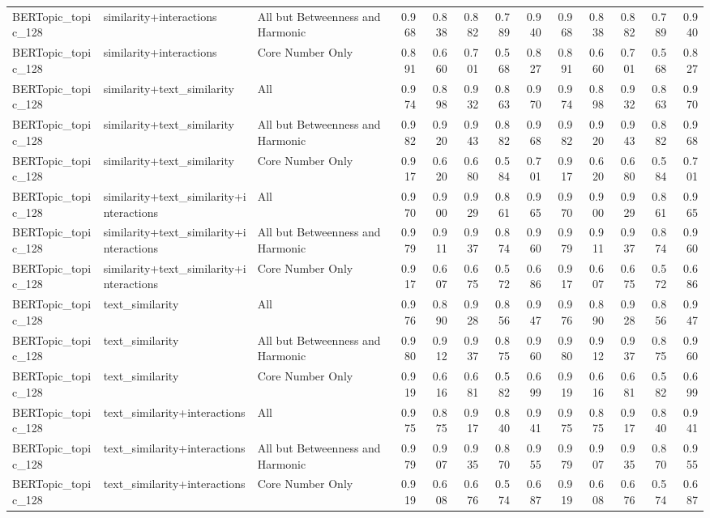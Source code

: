 \begin{tabular}{lllrrrrrrrrrr}
BERTopic_topic_128 & similarity+interactions & All but Betweenness and Harmonic & 0.968 & 0.838 & 0.882 & 0.789 & 0.940 & 0.968 & 0.838 & 0.882 & 0.789 & 0.940 \\
BERTopic_topic_128 & similarity+interactions & Core Number Only & 0.891 & 0.660 & 0.701 & 0.568 & 0.827 & 0.891 & 0.660 & 0.701 & 0.568 & 0.827 \\
BERTopic_topic_128 & similarity+text_similarity & All & 0.974 & 0.898 & 0.932 & 0.863 & 0.970 & 0.974 & 0.898 & 0.932 & 0.863 & 0.970 \\
BERTopic_topic_128 & similarity+text_similarity & All but Betweenness and Harmonic & 0.982 & 0.920 & 0.943 & 0.882 & 0.968 & 0.982 & 0.920 & 0.943 & 0.882 & 0.968 \\
BERTopic_topic_128 & similarity+text_similarity & Core Number Only & 0.917 & 0.620 & 0.680 & 0.584 & 0.701 & 0.917 & 0.620 & 0.680 & 0.584 & 0.701 \\
BERTopic_topic_128 & similarity+text_similarity+interactions & All & 0.970 & 0.900 & 0.929 & 0.861 & 0.965 & 0.970 & 0.900 & 0.929 & 0.861 & 0.965 \\
BERTopic_topic_128 & similarity+text_similarity+interactions & All but Betweenness and Harmonic & 0.979 & 0.911 & 0.937 & 0.874 & 0.960 & 0.979 & 0.911 & 0.937 & 0.874 & 0.960 \\
BERTopic_topic_128 & similarity+text_similarity+interactions & Core Number Only & 0.917 & 0.607 & 0.675 & 0.572 & 0.686 & 0.917 & 0.607 & 0.675 & 0.572 & 0.686 \\
BERTopic_topic_128 & text_similarity & All & 0.976 & 0.890 & 0.928 & 0.856 & 0.947 & 0.976 & 0.890 & 0.928 & 0.856 & 0.947 \\
BERTopic_topic_128 & text_similarity & All but Betweenness and Harmonic & 0.980 & 0.912 & 0.937 & 0.875 & 0.960 & 0.980 & 0.912 & 0.937 & 0.875 & 0.960 \\
BERTopic_topic_128 & text_similarity & Core Number Only & 0.919 & 0.616 & 0.681 & 0.582 & 0.699 & 0.919 & 0.616 & 0.681 & 0.582 & 0.699 \\
BERTopic_topic_128 & text_similarity+interactions & All & 0.975 & 0.875 & 0.917 & 0.840 & 0.941 & 0.975 & 0.875 & 0.917 & 0.840 & 0.941 \\
BERTopic_topic_128 & text_similarity+interactions & All but Betweenness and Harmonic & 0.979 & 0.907 & 0.935 & 0.870 & 0.955 & 0.979 & 0.907 & 0.935 & 0.870 & 0.955 \\
BERTopic_topic_128 & text_similarity+interactions & Core Number Only & 0.919 & 0.608 & 0.676 & 0.574 & 0.687 & 0.919 & 0.608 & 0.676 & 0.574 & 0.687 \\

\end{tabular}
